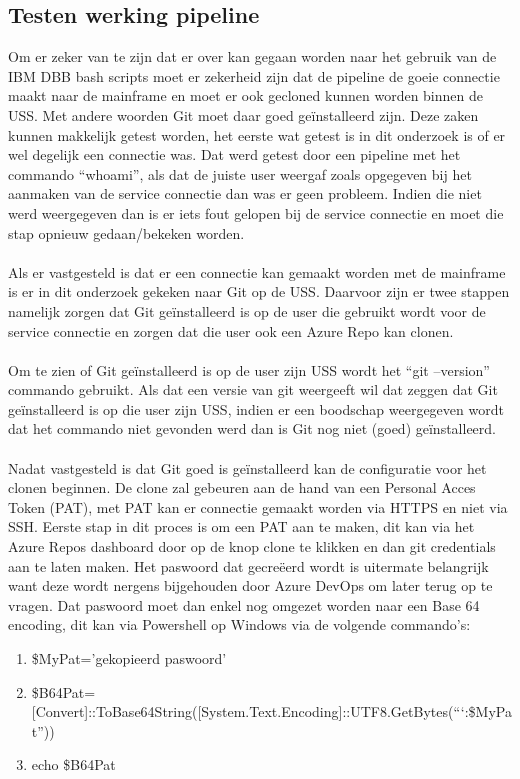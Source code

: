 \subsection{Testen werking pipeline}
Om er zeker van te zijn dat er over kan gegaan worden naar het gebruik van de IBM DBB bash scripts moet er zekerheid zijn dat de pipeline de goeie connectie maakt naar de mainframe en moet er ook gecloned kunnen worden binnen de USS. Met andere woorden Git moet daar goed geïnstalleerd zijn. Deze zaken kunnen makkelijk getest worden, het eerste wat getest is in dit onderzoek is of er wel degelijk een connectie was. Dat werd getest door een pipeline met het commando \enquote{whoami}, als dat de juiste user weergaf zoals opgegeven bij het aanmaken van de service connectie dan was er geen probleem. Indien die niet werd weergegeven dan is er iets fout gelopen bij de service connectie en moet die stap opnieuw gedaan/bekeken worden. 
\\ \\
Als er vastgesteld is dat er een connectie kan gemaakt worden met de mainframe is er in dit onderzoek gekeken naar Git op de USS. Daarvoor zijn er twee stappen namelijk zorgen dat Git geïnstalleerd is op de user die gebruikt wordt voor de service connectie en zorgen dat die user ook een Azure Repo kan clonen. 
\\ \\
Om te zien of Git geïnstalleerd is op de user zijn USS wordt het \enquote{git --version} commando gebruikt. Als dat een versie van git weergeeft wil dat zeggen dat Git geïnstalleerd is op die user zijn USS, indien er een boodschap weergegeven wordt dat het commando niet gevonden werd dan is Git nog niet (goed) geïnstalleerd. 
\\ \\ 
Nadat vastgesteld is dat Git goed is geïnstalleerd kan de configuratie voor het clonen beginnen. De clone zal gebeuren aan de hand van een Personal Acces Token (PAT), met PAT kan er connectie gemaakt worden via HTTPS en niet via SSH. Eerste stap in dit proces is om een PAT aan te maken, dit kan via het Azure Repos dashboard door op de knop clone te klikken en dan git credentials aan te laten maken. Het paswoord dat gecreëerd wordt is uitermate belangrijk want deze wordt nergens bijgehouden door Azure DevOps om later terug op te vragen. Dat paswoord moet dan enkel nog omgezet worden naar een Base 64 encoding, dit kan via Powershell op Windows via de volgende commando's:
\begin{enumerate}
    \item \$MyPat='gekopieerd paswoord'
    \item \$B64Pat=[Convert]::ToBase64String([System.Text.Encoding]::UTF8.GetBytes(\textquotedblleft`:\$MyPat\textquotedblright))
    \item echo \$B64Pat
\end{enumerate}
